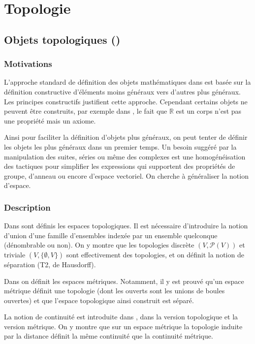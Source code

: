 \section{Topologie}

\subsection{Objets topologiques ()}

\subsubsection{Motivations}

L'approche standard de définition des objets mathématiques dans \coq est basée sur la définition constructive d'éléments moins généraux vers d'autres plus généraux. Les principes constructifs justifient cette approche. Cependant certains objets ne peuvent être construits, par exemple dans , le fait que $\mathbb{R}$ est un corps n'est pas une propriété mais un axiome.

Ainsi pour faciliter la définition d'objets plus généraux, on peut tenter de définir les objets les plus généraux dans un premier temps. Un besoin suggéré par la manipulation des suites, séries ou même des complexes est une homogénéisation des tactiques pour simplifier les expressions qui supportent des propriétés de groupe, d'anneau ou encore d'espace vectoriel. On cherche à généraliser la notion d'espace.

\subsubsection{Description}

Dans  sont définis les espaces topologiques. Il est nécessaire d'introduire la notion d'union d'une famille d'ensembles indexée par un ensemble quelconque (dénombrable ou non). On y montre que les topologies discrète $(V,\mathcal{P}(V))$ et triviale $(V,\{\emptyset,V\})$ sont effectivement des topologies, et on définit la notion de séparation (T2, de Hausdorff).

Dans  on définit les espaces métriques. Notamment, il y est prouvé qu'un espace métrique définit une topologie (dont les ouverts sont les unions de boules ouvertes) et que l'espace topologique ainsi construit est séparé.

La notion de continuité est introduite dans , dans la version topologique et la version métrique. On y montre que sur un espace métrique la topologie induite par la distance définit la même continuité que la continuité métrique.

